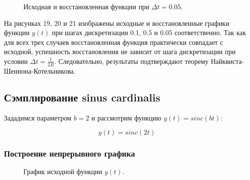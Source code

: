 \documentclass[a5paper, 10pt]{article}
\theoremstyle{definition}
\theoremstyle{plain}
\theoremstyle{remark}
\begin{document}
\begin{figure}[h!]
\caption{Исходная и восстановленная функции при $\Delta t = 0.05$.}
\end{figure}

На рисунках 19, 20 и 21 изображены исходные и восстановленные графики функции $y(t)$ при шагах дискретизации 0.1, 0.5 и 0.05 соответственно. Так как для всех трех случаев восстановленная функция практически совпадает с исходной, успешность восстановления не зависит от шага дискретизации при условии  $\Delta t = \frac{1}{2 B}$. Следовательно, результаты подтверждают теорему Найквиста-Шеннона-Котельникова.

\newpage
\subsection{Сэмплирование sinus cardinalis}
Зададимся параметром $b=2$ и рассмотрим функцию $y(t) = sinc(bt)$:

\begin{equation}
y(t) = sinc(2t)
\end{equation}

\subsubsection{Построение непрерывного графика}
\begin{figure}[h!]
\caption{График исходной функции $y(t)$.}
\end{figure}
\end{document}
